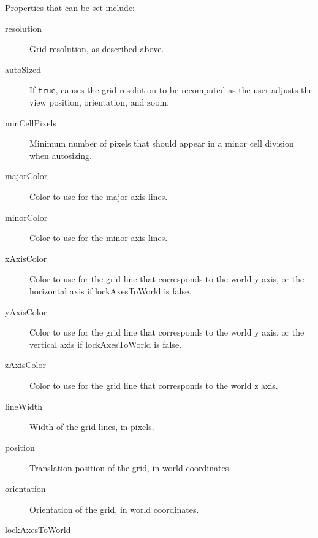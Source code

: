 \documentclass{article}
\begin{document}
Properties that can be set include:

\begin{description}

\item[resolution]\mbox{}

Grid resolution, as described above.

\item[autoSized]\mbox{}

If {\tt true}, causes the grid resolution to be recomputed as the user
adjusts the view position, orientation, and zoom.

\item[minCellPixels]\mbox{}

Minimum number of pixels that should appear in a minor cell division
when autosizing.

\item[majorColor]\mbox{}

Color to use for the major axis lines.

\item[minorColor]\mbox{}

Color to use for the minor axis lines.

\item[xAxisColor]\mbox{}

Color to use for the grid line that corresponds to the world y axis,
or the horizontal axis if {\sf lockAxesToWorld} is false.

\item[yAxisColor]\mbox{}

Color to use for the grid line that corresponds to the world y axis,
or the vertical axis if {\sf lockAxesToWorld} is false.

\item[zAxisColor]\mbox{}

Color to use for the grid line that corresponds to the world z
axis.

\item[lineWidth]\mbox{}

Width of the grid lines, in pixels.

\item[position]\mbox{}

Translation position of the grid, in world coordinates.

\item[orientation]\mbox{}

Orientation of the grid, in world coordinates.

\item[lockAxesToWorld]\mbox{}


\end{description}
\end{document}
